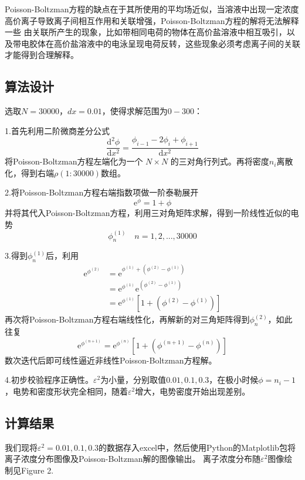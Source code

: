 \documentclass[twoside,twocolumn]{article}
\begin{document}
\begin{CJK*}{UTF8}{gkai}
Poisson-Boltzman方程的缺点在于其所使用的平均场近似，当溶液中出现一定浓度高价离子导致离子间相互作用和关联增强，Poisson-Boltzman方程的解将无法解释一些 由关联所产生的现象，比如带相同电荷的物体在高价盐溶液中相互吸引，以及带电胶体在高价盐溶液中的电泳呈现电荷反转，这些现象必须考虑离子间的关联才能得到合理解释。
\subsection{算法设计}
选取$N=30000$，$dx=0.01$，使得求解范围为$0-300$：

1.\quad  首先利用二阶微商差分公式
\begin{equation*}
\frac{\mathrm{d}^{2}\phi}{\mathrm{d}x^{2}}= \frac{\phi_{i-1}-2\phi_{i}+\phi_{i+1}}{\mathrm{d}x^{2}}
\end{equation*}
将Poisson-Boltzman方程左端化为一个 $N\times N$ 的三对角行列式。再将密度$n_{i}$离散化，得到右端$\rho (1:30000)$数组。

2.\quad 将Poisson-Boltzman方程右端指数项做一阶泰勒展开　
\begin{equation*}
\mathrm{e}^{\phi}=1+\phi
\end{equation*}
并将其代入Poisson-Boltzman方程，利用三对角矩阵求解，得到一阶线性近似的电势
\begin{equation*}
\phi_{n}^{(1)}\quad n=1,2,...,30000
\end{equation*}

3.\quad 得到$\phi_{n}^{(1)}$后，利用
\begin{equation*}
\begin{aligned}
\mathrm{e}^{\phi^{(2)}}
&=\mathrm{e}^{\phi^{(1)}+(\phi^{(2)}-\phi^{(1)})}\\
&=\mathrm{e}^{\phi^{(1)}}\mathrm{e}^{(\phi^{(2)}-\phi^{(1)})}\\
&=\mathrm{e}^{\phi^{(1)}}[1+(\phi^{(2)}-\phi^{(1)})]
\end{aligned}
\end{equation*}
再次将Poisson-Boltzman方程右端线性化，再解新的对三角矩阵得到$\phi_{n}^{(2)}$，如此往复
\begin{equation*}
\mathrm{e}^{\phi^{(n+1)}}=\mathrm{e}^{\phi^{(n)}}[1+(\phi^{(n+1)}-\phi^{(n)})]
\end{equation*}
数次迭代后即可线性逼近非线性Poisson-Boltzman方程解。

4.\quad 初步校验程序正确性。$\varepsilon^{2}$为小量，分别取值$0.01,0.1,0.3$，在极小时候$\phi=n_{i}-1$，电势和密度形状完全相同，随着$\varepsilon^{2}$增大，电势密度开始出现差别。
\subsection{计算结果}
我们现将$\varepsilon^{2}=0.01,0.1,0.3$的数据存入excel中，然后使用Python的Matplotlib包将离子浓度分布图像及Poisson-Boltzman解的图像输出。
离子浓度分布随$\varepsilon^{2}$图像绘制见Figure 2.


\end{CJK*}
\end{document}
